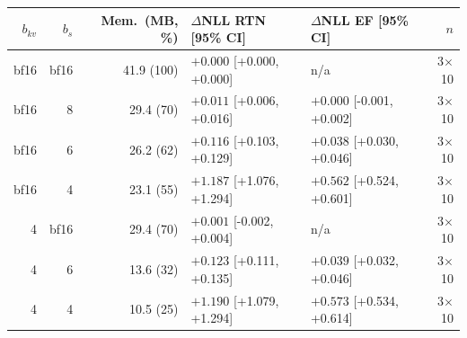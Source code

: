 \begin{tabular}{rrrllr}
\toprule
$b_{kv}$ & $b_s$ & Mem.\ (MB, \%) & $\Delta$NLL RTN [95\% CI] & $\Delta$NLL EF [95\% CI] & $n$ \\
\midrule
bf16 & bf16 & 41.9 (100) & $+0.000$ [+0.000, +0.000] & n/a & 3$\times$10 \\
bf16 & 8 & 29.4 (70) & $+0.011$ [+0.006, +0.016] & $+0.000$ [-0.001, +0.002] & 3$\times$10 \\
bf16 & 6 & 26.2 (62) & $+0.116$ [+0.103, +0.129] & $+0.038$ [+0.030, +0.046] & 3$\times$10 \\
bf16 & 4 & 23.1 (55) & $+1.187$ [+1.076, +1.294] & $+0.562$ [+0.524, +0.601] & 3$\times$10 \\
4 & bf16 & 29.4 (70) & $+0.001$ [-0.002, +0.004] & n/a & 3$\times$10 \\
4 & 6 & 13.6 (32) & $+0.123$ [+0.111, +0.135] & $+0.039$ [+0.032, +0.046] & 3$\times$10 \\
4 & 4 & 10.5 (25) & $+1.190$ [+1.079, +1.294] & $+0.573$ [+0.534, +0.614] & 3$\times$10 \\
\bottomrule
\end{tabular}
